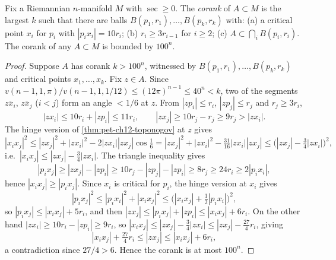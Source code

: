 \begin{lemma}
  \label{lem:pet-ch12-corank-bound}
  Fix a Riemannian $n$-manifold $M$ with $\sec\ge0$. The \emph{corank} of
  $A\subset M$ is the largest $k$ such that there are balls
  $B(p_1,r_1),\dots,B(p_k,r_k)$ with: (a) a critical point $x_i$ for $p_i$ with
  $|p_ix_i|=10r_i$; (b) $r_i\ge3r_{i-1}$ for $i\ge2$; (c)
  $A\subset\bigcap_iB(p_i,r_i)$. The corank of any $A\subset M$ is bounded by
  $100^n$.
\end{lemma}
\begin{proof}
  Suppose $A$ has corank $k>100^n$, witnessed by
  $B(p_1,r_1),\dots,B(p_k,r_k)$ and critical points $x_1,\dots,x_k$. Fix
  $z\in A$. Since $v(n-1,1,\pi)/v(n-1,1,1/12)\le(12\pi)^{n-1}\le40^n<k$, two of
  the segments $\overline{zx_i}$, $\overline{zx_j}$ ($i<j$) form an angle
  $<1/6$ at $z$. From $|zp_i|\le r_i$, $|zp_j|\le r_j$ and $r_j\ge3r_i$,
  \[
    |zx_i|\le10r_i+|zp_i|\le11r_i,\qquad|zx_j|\ge10r_j-r_j\ge9r_j>|zx_i|.
  \]
  The hinge version of \cref{thm:pet-ch12-toponogov} at $z$ gives
  \[
    |x_ix_j|^2\le|zx_j|^2+|zx_i|^2-2|zx_i||zx_j|\cos\tfrac16
    =|zx_j|^2+|zx_i|^2-\tfrac{31}{16}|zx_i||zx_j|\le\big(|zx_j|-\tfrac34|zx_i|\big)^2,
  \]
  i.e.\ $|x_ix_j|\le|zx_j|-\tfrac34|zx_i|$. The triangle inequality gives
  \[
    |p_ix_j|\ge|zx_j|-|zp_i|\ge10r_j-|zp_j|-|zp_i|\ge8r_j\ge24r_i\ge2|p_ix_i|,
  \]
  hence $|x_ix_j|\ge|p_ix_j|$. Since $x_i$ is critical for $p_i$, the hinge
  version at $x_i$ gives
  \[
    |p_ix_j|^2\le|p_ix_i|^2+|x_ix_j|^2\le\big(|x_ix_j|+\tfrac12|p_ix_i|\big)^2,
  \]
  so $|p_ix_j|\le|x_ix_j|+5r_i$, and then
  $|zx_j|\le|p_ix_j|+|zp_i|\le|x_ix_j|+6r_i$. On the other hand
  $|zx_i|\ge10r_i-|zp_i|\ge9r_i$, so
  $|x_ix_j|\le|zx_j|-\tfrac34|zx_i|\le|zx_j|-\tfrac{27}4r_i$, giving
  \[
    |x_ix_j|+\tfrac{27}4r_i\le|zx_j|\le|x_ix_j|+6r_i,
  \]
  a contradiction since $27/4>6$. Hence the corank is at most $100^n$.
\end{proof}

